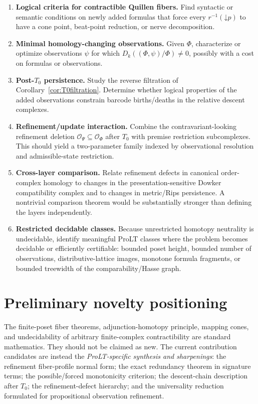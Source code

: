 \documentclass[11pt]{article}
\theoremstyle{definition}
\newcommand{\OX}{\mathcal O}
\newcommand{\down}{\mathord\downarrow}
\begin{document}
\begin{enumerate}[label=\textbf{T\arabic*.},leftmargin=2.8em]
\item \textbf{Logical criteria for contractible Quillen fibers.} Find syntactic or semantic conditions on newly added formulas that force every \(r^{-1}(\down p)\) to have a cone point, beat-point reduction, or nerve decomposition.
\item \textbf{Minimal homology-changing observations.} Given \(\Phi\), characterize or optimize observations \(\psi\) for which \(D_k((\Phi,\psi)/\Phi)\neq0\), possibly with a cost on formulas or observations.
\item \textbf{Post-\(T_0\) persistence.} Study the reverse filtration of Corollary~\ref{cor:T0filtration}. Determine whether logical properties of the added observations constrain barcode births/deaths in the relative descent complexes.
\item \textbf{Refinement/update interaction.} Combine the contravariant-looking refinement deletion \(\OX_\Psi\subseteq\OX_\Phi\) after \(T_0\) with premise restriction subcomplexes. This should yield a two-parameter family indexed by observational resolution and admissible-state restriction.
\item \textbf{Cross-layer comparison.} Relate refinement defects in canonical order-complex homology to changes in the presentation-sensitive Dowker compatibility complex and to changes in metric/Rips persistence. A nontrivial comparison theorem would be substantially stronger than defining the layers independently.
\item \textbf{Restricted decidable classes.} Because unrestricted homotopy neutrality is undecidable, identify meaningful ProLT classes where the problem becomes decidable or efficiently certifiable: bounded poset height, bounded number of observations, distributive-lattice images, monotone formula fragments, or bounded treewidth of the comparability/Hasse graph.
\end{enumerate}

\section{Preliminary novelty positioning}

The finite-poset fiber theorems, adjunction-homotopy principle, mapping cones, and undecidability of arbitrary finite-complex contractibility are standard mathematics. They should not be claimed as new. The current contribution candidates are instead the \emph{ProLT-specific synthesis and sharpenings}: the refinement fiber-profile normal form; the exact redundancy theorem in signature terms; the possible/forced monotonicity criterion; the descent-chain description after \(T_0\); the refinement-defect hierarchy; and the universality reduction formulated for propositional observation refinement.
\end{document}
